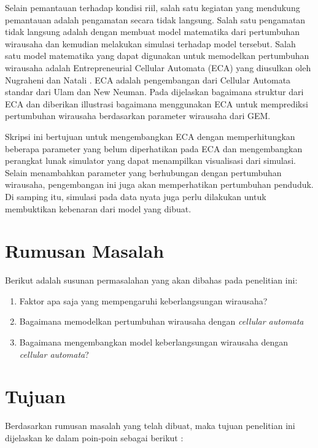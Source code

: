 Selain pemantauan terhadap kondisi riil, salah satu kegiatan yang mendukung pemantauan adalah pengamatan secara tidak langsung. Salah satu pengamatan tidak langsung adalah dengan membuat model matematika dari pertumbuhan wirausaha dan kemudian melakukan simulasi terhadap model tersebut. Salah satu model matematika yang dapat digunakan untuk memodelkan pertumbuhan wirausaha adalah Entrepreneurial Cellular Automata (ECA) yang diusulkan oleh Nugraheni dan Natali \footnotemark. ECA adalah pengembangan dari Cellular Automata standar dari Ulam dan New Neuman. Pada \footnotemark[\value{footnote}
] dijelaskan bagaimana struktur dari ECA dan diberikan illustrasi bagaimana menggunakan ECA untuk memprediksi pertumbuhan wirausaha berdasarkan parameter wirausaha dari GEM. 


Skripsi ini bertujuan untuk mengembangkan ECA dengan memperhitungkan beberapa parameter yang belum diperhatikan pada ECA dan mengembangkan perangkat lunak simulator yang dapat menampilkan visualisasi dari simulasi. Selain menambahkan parameter yang berhubungan dengan pertumbuhan wirausaha, pengembangan ini juga akan memperhatikan pertumbuhan penduduk. Di samping itu, simulasi pada data nyata juga perlu dilakukan untuk membuktikan kebenaran dari model yang dibuat.







\section{Rumusan Masalah}
\label{sec:rumusan}
Berikut adalah susunan permasalahan yang akan dibahas pada penelitian ini:


\begin{enumerate}
	\item Faktor apa saja yang mempengaruhi keberlangsungan wirausaha?
	\item Bagaimana memodelkan pertumbuhan wirausaha dengan \textit{cellular automata}
	\item Bagaimana mengembangkan model keberlangsungan wirausaha dengan \textit{cellular automata}?
\end{enumerate}



\section{Tujuan}
\label{sec:tujuan}
Berdasarkan rumusan masalah yang telah dibuat, maka tujuan penelitian ini dijelaskan ke dalam poin-poin sebagai berikut :


